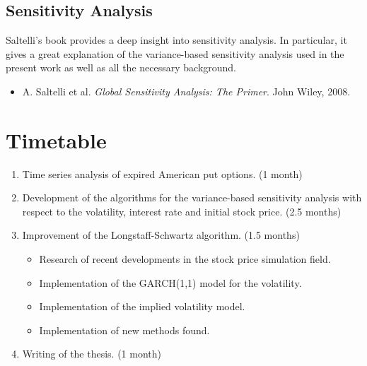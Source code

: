 \documentclass[a4paper,twocolumn,aps,prd,longbibliography,superscriptaddress]{revtex4-1}
\begin{document}
\subsection{Sensitivity Analysis}
Saltelli's book provides a deep insight into sensitivity analysis. In particular, it gives a great explanation of the variance-based sensitivity analysis used in the present work as well as all the necessary background.
\begin{itemize}
\item A. Saltelli et al. \textit{Global Sensitivity Analysis: The Primer}. John Wiley, 2008.
\end{itemize}

\section{Timetable}
\begin{enumerate}
\item Time series analysis of expired American put options. (1 month)
\item Development of the algorithms for the variance-based sensitivity analysis with respect to the volatility, interest rate and initial stock price. (2.5 months)
\item Improvement of the Longstaff-Schwartz algorithm. (1.5 months)
\begin{itemize}
\item Research of recent developments in the stock price simulation field.
\item Implementation of the GARCH(1,1) model for the volatility.
\item Implementation of the implied volatility model.
\item Implementation of new methods found.
\end{itemize}
\item Writing of the thesis. (1 month)
\end{enumerate}




\end{document}
